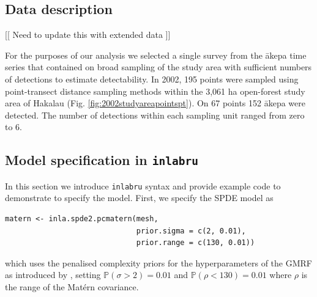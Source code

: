 \documentclass[preprint,12pt]{elsarticle}
\newcommand{\akepa}{\textquotesingle\={a}kepa}  %
\begin{document}
\subsection*{Data description}
[[ Need to update this with extended data ]]

For the purposes of our analysis we selected a single survey from the \akepa{} time series that contained on broad sampling of the study area with sufficient numbers of detections to estimate detectability. In 2002, 195 points were sampled using point-transect distance sampling methods within the 3,061 ha open-forest study area of Hakalau (Fig. \ref{fig:2002studyareapointspt}). On 67 points 152 \akepa{} were detected. The number of detections within each sampling unit ranged from zero to 6. 



\subsection*{Model specification in \texttt{inlabru}}


In this section we introduce \texttt{inlabru} syntax and provide example code to demonstrate to specify the model.  First, we specify the SPDE model as
\begin{lstlisting}
matern <- inla.spde2.pcmatern(mesh, 
                              prior.sigma = c(2, 0.01),    
                              prior.range = c(130, 0.01))
\end{lstlisting}
which uses the penalised complexity priors for the hyperparameters of the GMRF as introduced by \cite{simpson_penalising_2017}, setting $\mathbb{P}(\sigma > 2) = 0.01$ and $\mathbb{P}(\rho < 130) = 0.01$ where $\rho$ is the range of the Mat\'ern covariance.  
\end{document}
